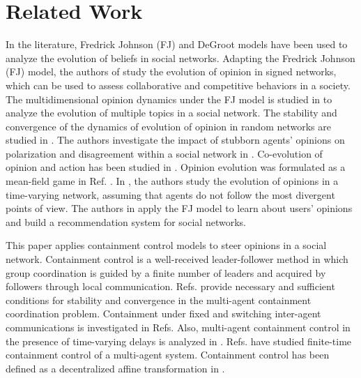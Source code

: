 \section{Related Work}
In the literature, Fredrick Johnson (FJ) \cite{zhou2024friedkin, frasca2024opinion} and DeGroot \cite{wu2022mixed, zhou2020two, liu2022probabilistic} models have been used to analyze the evolution of beliefs in social networks. Adapting the Fredrick Johnson (FJ) model, the authors of \cite{kang2022coevolution, 10591448, lin2018opinion} study the evolution of opinion in signed networks, which can be used to assess collaborative and competitive behaviors in a society. The multidimensional opinion dynamics under the FJ model is studied in \cite{parsegov2016novel, zhou2022multidimensional} to analyze the evolution of multiple topics in a social network. The stability and convergence of the dynamics of evolution of opinion in random networks are studied in \cite{wang2024final, xing2024transient, xing2024concentration}. The authors investigate the impact of stubborn agents' opinions on polarization and disagreement within a social network in \cite{shirzadi2024stubborn}. Co-evolution of opinion and action has been studied in \cite{9303954, mo2022coevolution, wang2024co, 10168221}. Opinion evolution was formulated as a mean-field game in Ref. \cite{6760259}. In \cite{debuse2024study}, the authors study the evolution of opinions in a time-varying network, assuming that agents do not follow the most divergent points of view. The authors in \cite{sprenger2024control} apply the FJ model to learn about users' opinions and build a recommendation system for social networks.  

This paper applies containment control models to steer opinions in a social network. Containment control is  a well-received  leader-follower method in which group coordination is guided by a finite number of leaders and acquired by followers through local communication. Refs. \cite{cao2012distributed, ji2008containment} provide necessary and sufficient conditions for stability and convergence in the multi-agent containment coordination problem. Containment under fixed and switching inter-agent communications is investigated in Refs. \cite{cao2012distributed, notarstefano2011containment, li2015containment} Also,  multi-agent containment control in the presence of time-varying delays is analyzed in \cite{shen2016containment, liu2014containment}. Refs. \cite{wang2013distributed, liu2015distributed}  have studied finite-time containment control of a multi-agent system. Containment control has been defined as a decentralized affine transformation in \cite{rastgoftar2021scalable, rastgoftar2021safe, rastgoftar2022spatio}.
